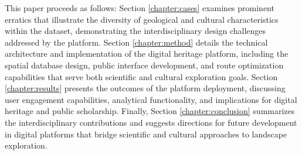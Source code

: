 This paper proceeds as follows: Section \ref{chapter:cases} examines prominent erratics that illustrate the diversity of geological and cultural characteristics within the dataset, demonstrating the interdisciplinary design challenges addressed by the platform. Section \ref{chapter:method} details the technical architecture and implementation of the digital heritage platform, including the spatial database design, public interface development, and route optimization capabilities that serve both scientific and cultural exploration goals. Section \ref{chapter:results} presents the outcomes of the platform deployment, discussing user engagement capabilities, analytical functionality, and implications for digital heritage and public scholarship. Finally, Section \ref{chapter:conclusion} summarizes the interdisciplinary contributions and suggests directions for future development in digital platforms that bridge scientific and cultural approaches to landscape exploration.
